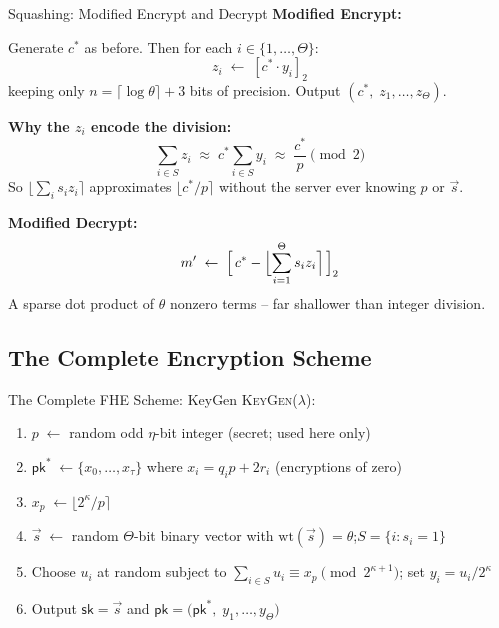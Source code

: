 \documentclass[10pt,handout]{beamer}
\begin{document}
\begin{frame}{Squashing: Modified Encrypt and Decrypt}
    \textbf{Modified Encrypt:}

    Generate $c^*$ as before. Then for each $i \in \{1,\ldots,\Theta\}$:
    \[
        z_i \;\leftarrow\; [c^* \cdot y_i]_2
    \]
    keeping only $n = \lceil\log\theta\rceil + 3$ bits of precision.
    Output $(c^*,\; z_1, \ldots, z_\Theta)$.
    \pause

    \vspace{0.2cm}
    \textbf{Why the $z_i$ encode the division:}
    \[
        \sum_{i \in S} z_i
        \;\approx\; c^* \sum_{i \in S} y_i
        \;\approx\; \frac{c^*}{p} \pmod{2}
    \]
    So $\lfloor \sum_i s_i z_i \rceil$ approximates $\lfloor c^*/p \rceil$
    without the server ever knowing $p$ or $\vec{s}$.
    \pause

    \vspace{0.2cm}
    \textbf{Modified Decrypt:}
    \[
        m' \;\leftarrow\;
        \Bigl[\, c^* - \Bigl\lfloor \sum_{i=1}^\Theta s_i z_i \Bigr\rceil \,\Bigr]_2
    \]
    A sparse dot product of $\theta$ nonzero terms  --  far shallower than
    integer division.
\end{frame}

\subsection{The Complete Encryption Scheme}

\begin{frame}{The Complete FHE Scheme: KeyGen}
    \textsc{KeyGen}($\lambda$):
    \begin{enumerate}
        \item $p \;\leftarrow$ random odd $\eta$-bit integer
              \hfill{\small(secret; used here only)}
        \item $\mathsf{pk}^* \;\leftarrow \{x_0,\ldots,x_\tau\}$
              where $x_i = q_i p + 2r_i$
              \hfill{\small(encryptions of zero)}
        \item $x_p \;\leftarrow \lfloor 2^\kappa/p \rceil$
        \item $\vec{s} \;\leftarrow$ random $\Theta$-bit binary vector
              with $\mathrm{wt}(\vec{s}) = \theta$;\quad $S = \{i : s_i = 1\}$
        \item Choose $u_i$ at random subject to
              $\displaystyle\sum_{i\in S} u_i \equiv x_p \pmod{2^{\kappa+1}}$;\quad
              set $y_i = u_i/2^\kappa$
        \item Output $\mathsf{sk} = \vec{s}$ and
              $\mathsf{pk} = \bigl(\mathsf{pk}^*,\; y_1, \ldots, y_\Theta\bigr)$
    \end{enumerate}
\end{frame}
\end{document}
